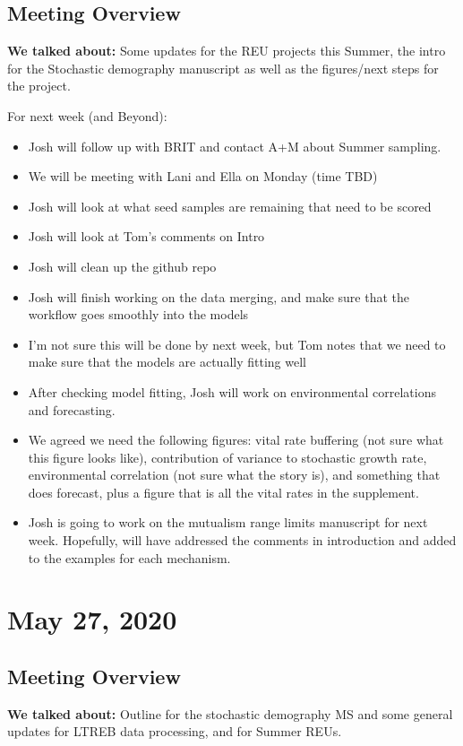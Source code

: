 \documentclass{article}
\begin{document}
\subsection*{Meeting Overview}
\textbf{We talked about:}
Some updates for the REU projects this Summer, the intro for the Stochastic demography manuscript as well as the figures/next steps for the project.

For next week (and Beyond):
\begin{itemize}
\item{Josh will follow up with BRIT and contact A+M about Summer sampling.}
\item{We will be meeting with Lani and Ella on Monday (time TBD)}
\item{Josh will look at what seed samples are remaining that need to be scored}
\item{Josh will look at Tom's comments on Intro}
\item{Josh will clean up the github repo}
\item{Josh will finish working on the data merging, and make sure that the workflow goes smoothly into the models}
\item{I'm not sure this will be done by next week, but Tom notes that we need to make sure that the models are actually fitting well}
\item{After checking model fitting, Josh will work on environmental correlations and forecasting.}
\item{We agreed we need the following figures: vital rate buffering (not sure what this figure looks like), contribution of variance to stochastic growth rate, environmental correlation (not sure what the story is), and something that does forecast, plus a figure that is all the vital rates in the supplement.}
\item{Josh is going to work on the mutualism range limits manuscript for next week. Hopefully, will have addressed the comments in introduction and added to the examples for each mechanism.}
\end{itemize}

\section*{May 27, 2020}
\subsection*{Meeting Overview}
\textbf{We talked about:}
Outline for the stochastic demography MS and some general updates for LTREB data processing, and for Summer REUs. 
\end{document}
